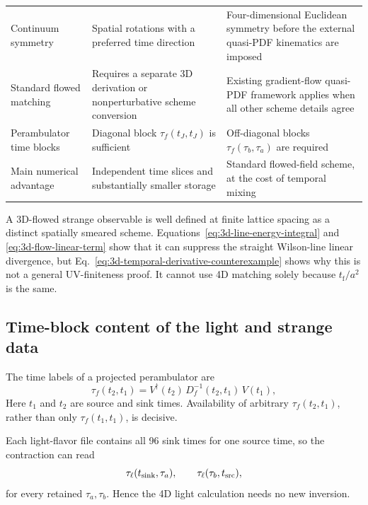 \documentclass[11pt]{article}
\numberwithin{equation}{section}
\newcommand{\tf}{t_{\mathrm f}}
\begin{document}
\begin{longtable}{
  >{\raggedright\arraybackslash}p{}
  >{\raggedright\arraybackslash}p{}
  >{\raggedright\arraybackslash}p{}}
  Continuum symmetry
  & Spatial rotations with a preferred time direction
  & Four-dimensional Euclidean symmetry before the external quasi-PDF
    kinematics are imposed \\
  Standard flowed matching
  & Requires a separate 3D derivation or nonperturbative scheme conversion
  & Existing gradient-flow quasi-PDF framework applies when all other scheme
    details agree \\
  Perambulator time blocks
  & Diagonal block \(\tau_f(t_J,t_J)\) is sufficient
  & Off-diagonal blocks \(\tau_f(\tau_b,\tau_a)\) are required \\
  Main numerical advantage
  & Independent time slices and substantially smaller storage
  & Standard flowed-field scheme, at the cost of temporal mixing \\
  \bottomrule
\end{longtable}

A 3D-flowed strange observable is well defined at finite lattice spacing as a
distinct spatially smeared scheme.  Equations~\eqref{eq:3d-line-energy-integral}
and \eqref{eq:3d-flow-linear-term} show that it can suppress the straight
Wilson-line linear divergence, but
Eq.~\eqref{eq:3d-temporal-derivative-counterexample} shows why this is not a
general UV-finiteness proof.  It cannot use 4D matching solely because
\(\tf/a^2\) is the same.

\subsection{Time-block content of the light and strange data}

The time labels of a projected perambulator are
\begin{equation}
  \tau_f(t_2,t_1)
  =
  V^\dagger(t_2)\,
  D_f^{-1}(t_2,t_1)\,
  V(t_1),
  \label{eq:perambulator-time-block}
\end{equation}
Here \(t_1\) and \(t_2\) are source and sink times. Availability of arbitrary
\(\tau_f(t_2,t_1)\), rather than only \(\tau_f(t_1,t_1)\), is decisive.

Each light-flavor file contains all 96 sink times for one source time, so the
contraction can read
\begin{equation}
  \tau_\ell(t_{\rm sink},\tau_a),
  \qquad
  \tau_\ell(\tau_b,t_{\rm src}),
  \label{eq:light-required-blocks}
\end{equation}
for every retained \(\tau_a,\tau_b\). Hence the 4D light calculation needs no
new inversion.
\end{document}
